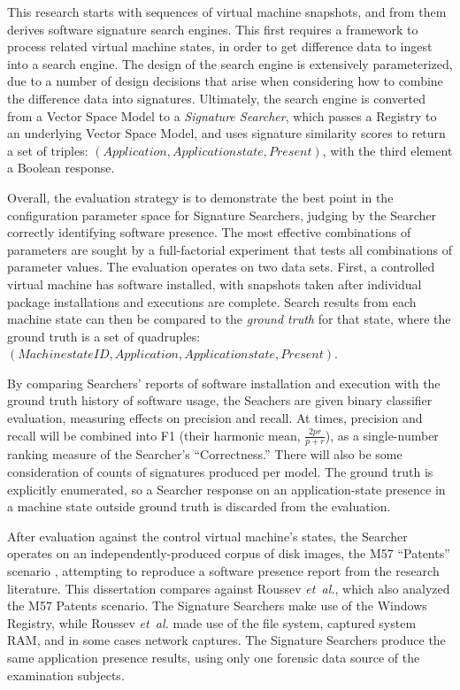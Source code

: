 \documentclass[11pt]{ucthesis}
\theoremstyle{plain}
\theoremstyle{definition}
\newcommand{\etal}{\emph{et~al.}\xspace}
\begin{document}
This research starts with sequences of virtual machine snapshots, and from them derives software signature search engines.  This first requires a framework to process related virtual machine states, in order to get difference data to ingest into a search engine.  The design of the search engine is extensively parameterized, due to a number of design decisions that arise when considering how to combine the difference data into signatures.  Ultimately, the search engine is converted from a Vector Space Model to a \emph{Signature Searcher}, which passes a Registry to an underlying Vector Space Model, and uses signature similarity scores to return a set of triples:  $(\mathit{Application}, \mathit{Application state}, \mathit{Present})$, with the third element a Boolean response.

Overall, the evaluation strategy is to demonstrate the best point in the configuration parameter space for Signature Searchers, judging by the Searcher correctly identifying software presence.  The most effective combinations of parameters are sought by a full-factorial experiment \cite{box:wiley78} that tests all combinations of parameter values.  The evaluation operates on two data sets.  First, a controlled virtual machine has software installed, with snapshots taken after individual package installations and executions are complete.  Search results from each machine state can then be compared to the \emph{ground truth} for that state, where the ground truth is a set of quadruples: $(\mathit{Machine state ID}, \mathit{Application}, \mathit{Application state}, \mathit{Present})$.

By comparing Searchers' reports of software installation and execution with the ground truth history of software usage, the Seachers are given binary classifier evaluation, measuring effects on precision and recall.  At times, precision and recall will be combined into F1 (their harmonic mean, $\frac{2pr}{p+r}$), as a single-number ranking measure of the Searcher's ``Correctness.''  There will also be some consideration of counts of signatures produced per model.  The ground truth is explicitly enumerated, so a Searcher response on an application-state presence in a machine state outside ground truth is discarded from the evaluation.

After evaluation against the control virtual machine's states, the Searcher operates on an independently-produced corpus of disk images, the M57 ``Patents'' scenario \cite{woods:adfsl11}, attempting to reproduce a software presence report from the research literature.  This dissertation compares against Roussev \etal \cite{roussev:dfrws12}, which also analyzed the M57 Patents scenario.  The Signature Searchers make use of the Windows Registry, while Roussev \etal made use of the file system, captured system RAM, and in some cases network captures.  The Signature Searchers produce the same application presence results, using only one forensic data source of the examination subjects.
\end{document}
